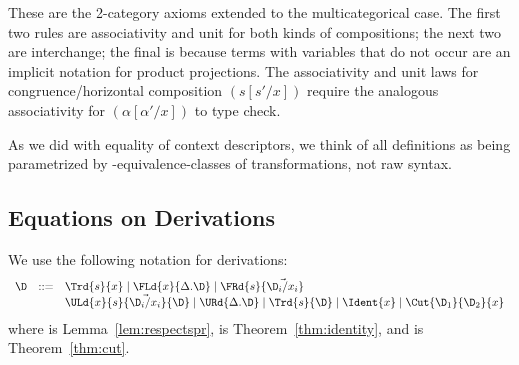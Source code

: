 \noindent These are the 2-category axioms extended to the
multicategorical case.  The first two rules are associativity and unit
for both kinds of compositions; the next two are interchange; the final
is because terms with variables that do not occur are an implicit
notation for product projections.  The associativity and unit laws for
congruence/horizontal composition $(s[s'/x])$ require the analogous
associativity for $(\alpha[\alpha'/x])$ to type check.

As we did with equality of context descriptors, we think of all
definitions as being parametrized by \deq-equivalence-classes of
transformations, not raw syntax.

\subsection{Equations on Derivations}

We use the following notation for derivations:
\[
\begin{array}{rcl}
\D & ::= & \Trd{s}{x} \mid \FLd{x}{\Delta.\D} \mid \FRd{s}{\vec{\D_i/x_i}} \\
& & \ULd{x}{s}{\vec{\D_i/x_i}}{\D} \mid \URd{\Delta.\D} \mid \Trd{s}{\D} \mid
\Ident{x} \mid \Cut{\D_1}{\D_2}{x}
\end{array}
\]
where  is Lemma~\ref{lem:respectspr},  is
Theorem~\ref{thm:identity}, and  is
Theorem~\ref{thm:cut}.

